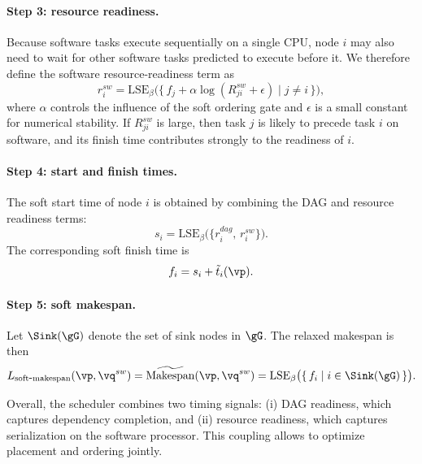 \paragraph{\textbf{Step 3: resource readiness.}}
Because software tasks execute sequentially on a single CPU, node $i$ may also need to wait for other software tasks predicted to execute before it. We therefore define the software resource-readiness term as
\begin{equation}
r_i^{sw}
=
\mathrm{LSE}_{\beta}
\Big(
\{\, f_j + \alpha \log(R^{sw}_{ji}+\epsilon) \mid j \neq i\,\}
\Big),
\end{equation}
where $\alpha$ controls the influence of the soft ordering gate and $\epsilon$ is a small constant for numerical stability. If $R^{sw}_{ji}$ is large, then task $j$ is likely to precede task $i$ on software, and its finish time contributes strongly to the readiness of $i$.

\paragraph{\textbf{Step 4: start and finish times.}}
The soft start time of node $i$ is obtained by combining the DAG and resource readiness terms:
\begin{equation}
s_i = \mathrm{LSE}_{\beta}\big(\{r_i^{dag},\, r_i^{sw}\}\big).
\end{equation}
The corresponding soft finish time is
\begin{equation}
f_i = s_i + \tilde{t}_i(\vp).
\end{equation}

\paragraph{\textbf{Step 5: soft makespan.}}
Let $\Sink(\gG)$ denote the set of sink nodes in $\gG$. The relaxed makespan is then
\begin{equation}
L_{\mathrm{soft\mbox{-}makespan}}(\vp,\vq^{sw})
=
\widetilde{\mathrm{Makespan}}(\vp,\vq^{sw})
=
\mathrm{LSE}_{\beta}\big(\{\, f_i \mid i \in \Sink(\gG)\,\}\big).
\end{equation}

Overall, the scheduler combines two timing signals: (i) DAG readiness, which captures dependency completion, and (ii) resource readiness, which captures serialization on the software processor. This coupling allows \diffgnn to optimize placement and ordering jointly.

